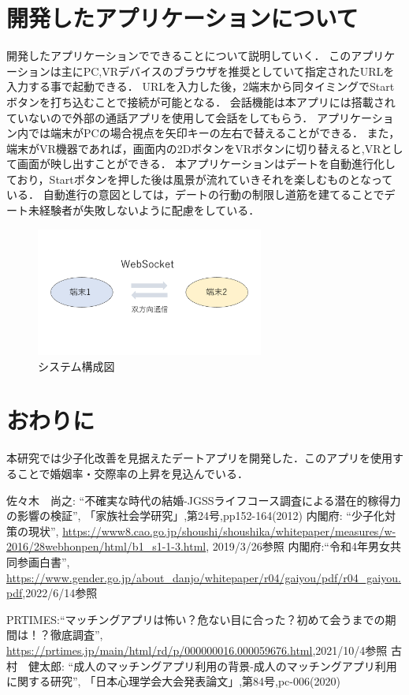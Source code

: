 \documentclass[twocolumn,10pt,a4j]{ltjsarticle}
\begin{document}
\section{開発したアプリケーションについて}
開発したアプリケーションでできることについて説明していく．
このアプリケーションは主にPC,VRデバイスのブラウザを推奨としていて指定されたURLを入力する事で起動できる．
URLを入力した後，2端末から同タイミングでStartボタンを打ち込むことで接続が可能となる．
会話機能は本アプリには搭載されていないので外部の通話アプリを使用して会話をしてもらう．
アプリケーション内では端末がPCの場合視点を矢印キーの左右で替えることができる．
また，端末がVR機器であれば，画面内の2DボタンをVRボタンに切り替えると,VRとして画面が映し出すことができる．
本アプリケーションはデートを自動進行化しており，Startボタンを押した後は風景が流れていきそれを楽しむものとなっている．
自動進行の意図としては，デートの行動の制限し道筋を建てることでデート未経験者が失敗しないように配慮をしている．

\begin{figure}[h]
\begin{center}
\includegraphics[width=75mm]{kougaisiryou.pdf}
\end{center}
 \caption{システム構成図}
\end{figure}

\section{おわりに}
本研究では少子化改善を見据えたデートアプリを開発した．このアプリを使用することで婚姻率・交際率の上昇を見込んでいる．

\begin{thebibliography}{99}
 佐々木　尚之: ``不確実な時代の結婚-JGSSライフコース調査による潜在的稼得力の影響の検証'', 「家族社会学研究」,第24号,pp152-164(2012)
 内閣府: ``少子化対策の現状'', \url{https://www8.cao.go.jp/shoushi/shoushika/whitepaper/measures/w-2016/28webhonpen/html/b1_s1-1-3.html}, 2019/3/26参照
内閣府:``令和4年男女共同参画白書'',
\url{https://www.gender.go.jp/about_danjo/whitepaper/r04/gaiyou/pdf/r04_gaiyou.pdf},2022/6/14参照


PRTIMES:``マッチングアプリは怖い？危ない目に合った？初めて会うまでの期間は！？徹底調査'',
\url{https://prtimes.jp/main/html/rd/p/000000016.000059676.html},2021/10/4参照
 古村　健太郎: ``成人のマッチングアプリ利用の背景-成人のマッチングアプリ利用に関する研究'', 「日本心理学会大会発表論文」,第84号,pc-006(2020)

\end{thebibliography}
\end{document}
